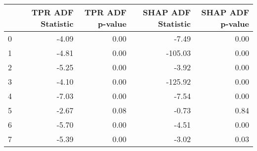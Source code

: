 \begin{tabular}{lrrrr}
\toprule
 & TPR ADF Statistic & TPR ADF p-value & SHAP ADF Statistic & SHAP ADF p-value \\
\midrule
0 & -4.09 & 0.00 & -7.49 & 0.00 \\
1 & -4.81 & 0.00 & -105.03 & 0.00 \\
2 & -5.25 & 0.00 & -3.92 & 0.00 \\
3 & -4.10 & 0.00 & -125.92 & 0.00 \\
4 & -7.03 & 0.00 & -7.54 & 0.00 \\
5 & -2.67 & 0.08 & -0.73 & 0.84 \\
6 & -5.70 & 0.00 & -4.51 & 0.00 \\
7 & -5.39 & 0.00 & -3.02 & 0.03 \\
\bottomrule
\end{tabular}
